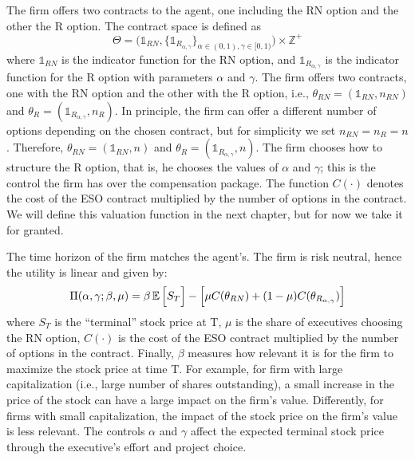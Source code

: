 The firm offers two contracts to the agent, one including the RN option and the other the R option. The contract space is defined as
$$ \Theta = \Biggl( \mathds{1}_{RN}, \bigl\{ \mathds{1}_{R_{\alpha, \gamma}} \bigr\}_{\alpha \in (0,1), \gamma \in [0, 1)} \Biggr) \times \mathbb{Z}^+ $$
where $\mathds{1}_{RN}$ is the indicator function for the RN option, and $\mathds{1}_{R_{\alpha, \gamma}}$ is the indicator function for the R option with parameters $\alpha$ and $\gamma$. The firm offers two contracts, one with the RN option and the other with the R option, i.e., $\theta_{RN} = (\mathds{1}_{RN}, n_{RN})$ and $\theta_{R} = (\mathds{1}_{R_{\alpha, \gamma}}, n_R) $. In principle, the firm can offer a different number of options depending on the chosen contract, but for simplicity we set $n_{RN} = n_R = n$. Therefore, $\theta_{RN} = (\mathds{1}_{RN}, n)$ and $\theta_{R} = (\mathds{1}_{R_{\alpha, \gamma}}, n) $. The firm chooses how to structure the R option, that is, he chooses the values of $\alpha$ and $\gamma$; this is the control the firm has over the compensation package. The function $C(\cdot)$ denotes the cost of the ESO contract multiplied by the number of options in the contract. We will define this valuation function in the next chapter, but for now we take it for granted.

The time horizon of the firm matches the agent's. The firm is risk neutral, hence the utility is linear and given by:
$$ \Pi (\alpha, \gamma; \beta, \mu) = \beta \operatorname{\mathbb{E}} \Big[ S_T \Big] - \Big[ \mu C(\theta_{RN}) + (1-\mu) C(\theta_{R_{\alpha, \gamma}}) \Big] $$
where $S_T$ is the ``terminal'' stock price at T, $\mu$ is the share of executives choosing the RN option, $C(\cdot)$ is the cost of the ESO contract multiplied by the number of options in the contract. Finally, $\beta$ measures how relevant it is for the firm to maximize the stock price at time T. For example, for firm with large capitalization (i.e., large number of shares outstanding), a small increase in the price of the stock can have a large impact on the firm's value. Differently, for firms with small capitalization, the impact of the stock price on the firm's value is less relevant. The controls $\alpha$ and $\gamma$ affect the expected terminal stock price through the executive's effort and project choice.

